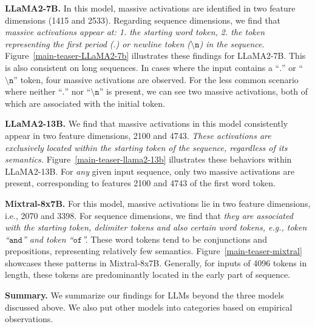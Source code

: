 \documentclass[10pt]{article}
\begin{document}
\textbf{LLaMA2-7B.} In this model, massive activations are identified in two feature dimensions (1415 and 2533). Regarding sequence dimensions, we find that \textit{massive activations appear at: 1. the starting word token, 2. the token representing the first period ($\texttt{.}$) or newline token ($\texttt{\textbackslash n}$) in the sequence}. Figure~\ref{main-teaser-LLaMA2-7b} illustrates these findings for LLaMA2-7B. This is also consistent on long sequences. In cases where the input contains a ``$\texttt{.}$'' or ``$\texttt{\textbackslash n}$'' token, four massive activations are observed. For the less common scenario where neither ``$\texttt{.}$'' nor ``$\texttt{\textbackslash n}$'' is present, we can see two massive activations, both of which are associated with the initial token. 


\textbf{LLaMA2-13B.} We find that massive activations in this model consistently appear in two feature dimensions, 2100 and 4743. \textit{These activations are exclusively located within the starting token of the sequence, regardless of its semantics.} Figure~\ref{main-teaser-llama2-13b} illustrates these behaviors within LLaMA2-13B. For \textit{any} given input sequence, only two massive activations are present, corresponding to features 2100 and 4743 of the first word token.

\textbf{Mixtral-8x7B.} For this model, massive activations lie in two feature dimensions, i.e., 2070 and 3398. For sequence dimensions, we find that \textit{they are associated with the starting token, delimiter tokens and also certain word tokens, e.g., token ``$\texttt{and}$'' and token ``$\texttt{of}$''.}  These word tokens tend to be conjunctions and prepositions, representing relatively few semantics. Figure~\ref{main-teaser-mixtral} showcases these patterns in Mixtral-8x7B. Generally, for inputs of 4096 tokens in length, these tokens are predominantly located in the early part of sequence.


\textbf{Summary.} We summarize our findings for LLMs beyond the three models discussed above. We also put other models into categories based on empirical observations.
\end{document}
